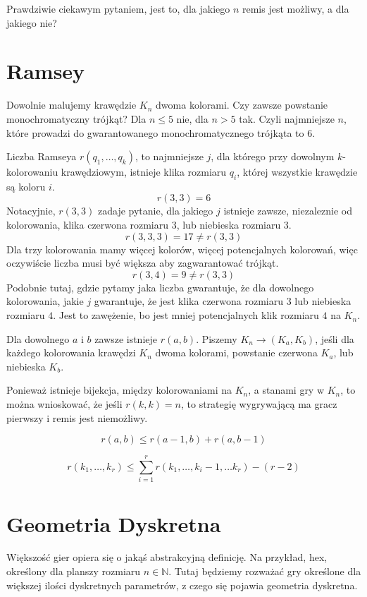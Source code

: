 \documentclass{../notatki}
\begin{document}
Prawdziwie ciekawym pytaniem, jest to, dla jakiego $n$ remis jest możliwy,
a dla jakiego nie?

\section{Ramsey}

Dowolnie malujemy krawędzie $K_n$ dwoma kolorami. Czy zawsze powstanie
monochromatyczny trójkąt? Dla $n \leq 5$ nie, dla $n > 5$ tak. Czyli najmniejsze
$n$, które prowadzi do gwarantowanego monochromatycznego trójkąta to 6.

\begin{examplebox}
  Liczba Ramseya $r(q_1, \dots, q_k)$, to najmniejsze $j$, dla którego przy
  dowolnym $k$-kolorowaniu krawędziowym, istnieje klika rozmiaru $q_i$, której
  wszystkie krawędzie są koloru $i$.
  $$
  r(3, 3) = 6
  $$
  Notacyjnie, $r(3, 3)$ zadaje pytanie, dla jakiego $j$ istnieje zawsze,
  niezaleznie od kolorowania, klika czerwona rozmiaru 3, lub
  niebieska rozmiaru 3.
  $$
  r(3, 3, 3) = 17 \neq r(3, 3)
  $$
  Dla trzy kolorowania mamy więcej kolorów, więcej potencjalnych kolorowań, więc
  oczywiście liczba musi być większa aby zagwarantować trójkąt.
  $$
  r(3, 4) = 9 \neq r(3, 3)
  $$
  Podobnie tutaj, gdzie pytamy jaka liczba gwarantuje, że dla dowolnego
  kolorowania, jakie $j$ gwarantuje, że jest klika czerwona rozmiaru $3$ lub
  niebieska rozmiaru $4$. Jest to zawężenie, bo jest mniej potencjalnych klik
  rozmiaru $4$ na $K_n$.
\end{examplebox}

Dla dowolnego $a$ i $b$ zawsze istnieje $r(a, b)$. Piszemy $K_n \to (K_a, K_b)$,
jeśli dla każdego kolorowania krawędzi $K_n$ dwoma kolorami, powstanie czerwona
$K_a$, lub niebieska $K_b$.

Ponieważ istnieje bijekcja, między kolorowaniami na $K_n$, a stanami gry
w $K_n$, to można wnioskować, że jeśli $r(k, k) = n$, to strategię
wygrywającą ma gracz pierwszy i remis jest niemożliwy.

$$
r(a, b) \leq r(a - 1, b) + r(a, b - 1)
$$

$$
r(k_1, \dots, k_r) \leq \sum_{i=1}^{r} r(k_1, \dots, k_i - 1, \dots
k_r) - (r - 2)
$$

\section{Geometria Dyskretna}

Większość gier opiera się o jakąś abstrakcyjną definicję. Na
przykład, hex, określony dla planszy rozmiaru $n \in \mathbb{N}$. Tutaj będziemy
rozważać gry określone dla większej ilości dyskretnych parametrów, z czego
się pojawia geometria dyskretna.
\end{document}
